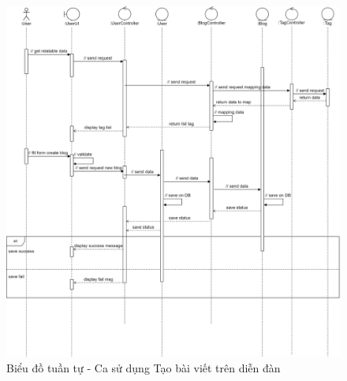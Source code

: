 \documentclass[./../main.tex]{subfiles}
\begin{document}
\begin{figure}[H]
	\centering
	\includegraphics[width=\linewidth]{./img/uc15.png}
	\caption{Biểu đồ tuần tự - Ca sử dụng Tạo bài viết trên diễn đàn}
\end{figure}
\end{document}
